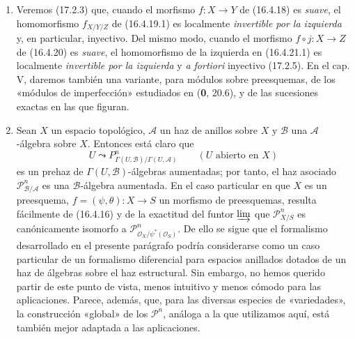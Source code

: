 \begin{remarks}[16.4.24]
\label{IV.16.4.24}
\begin{enumerate}
\item[(i)] Veremos (17.2.3) que, cuando el morfismo $f:X\to Y$ de
(16.4.18) es \emph{suave}, el homomorfismo $f_{X/Y/Z}$ de (16.4.19.1) es
localmente \emph{invertible por la izquierda} y, en particular, inyectivo. Del mismo modo,
cuando el morfismo $f\circ j:X\to Z$ de (16.4.20) es \emph{suave},
el homomorfismo de la izquierda en (16.4.21.1) es localmente
\emph{invertible por la izquierda} y \emph{a fortiori} inyectivo (17.2.5). En el cap. V,
daremos también una variante, para módulos sobre
preesquemas, de los «módulos de imperfección» estudiados en (\textbf 0, 20.6), y de las sucesiones
exactas en las que figuran.

\item[(ii)] Sean $X$ un espacio topológico, $\mathscr{A}$ un haz
de anillos sobre $X$ y $\mathscr{B}$ una $\mathscr{A}$-álgebra sobre $X$. Entonces está
claro que
\[
  U\leadsto
  P_{\Gamma(U,\mathscr{B})/\Gamma(U,\mathscr{A})}^n
  \qquad (U\text{ abierto en }X)
\]
es un prehaz de $\Gamma(U,\mathscr{B})$-álgebras aumentadas; por tanto, el
haz asociado $\mathscr{P}_{\mathscr{B}/\mathscr{A}}^n$ es una
$\mathscr{B}$-álgebra aumentada. En el caso particular en que $X$ es un
preesquema, $f=(\psi,\theta):X\to S$ un morfismo de preesquemas, resulta
fácilmente de (16.4.16) y de la exactitud del funtor $\varinjlim$ que
$\mathscr{P}_{X/S}^n$ es canónicamente isomorfo a
$\mathscr{P}_{\mathcal{O}_X/\psi^*(\mathcal{O}_S)}^n$. De ello se sigue que el
formalismo desarrollado en el presente parágrafo podría considerarse como
un
caso particular de un formalismo diferencial para espacios anillados dotados
de un haz de álgebras sobre el haz estructural. Sin embargo, no hemos
querido partir de este punto de vista, menos intuitivo y menos cómodo para las
aplicaciones. Parece, además, que, para las diversas especies de
«variedades», la construcción «global» de los $\mathscr{P}^n$, análoga a la que
utilizamos aquí, está también mejor adaptada a las aplicaciones.
\end{enumerate}
\end{remarks}
